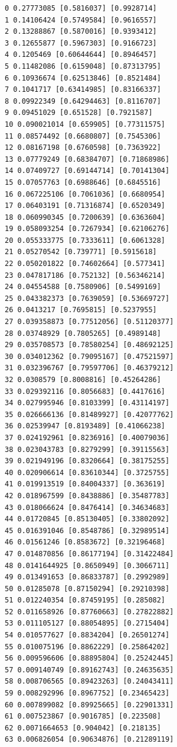 \documentclass[11pt]{article}
\begin{document}
    \begin{Verbatim}[commandchars=\\\{\}]
0 0.27773085 [0.5816037] [0.9928714]
1 0.14106424 [0.5749584] [0.9616557]
2 0.13288867 [0.5870016] [0.9393412]
3 0.12655877 [0.5967303] [0.9166723]
4 0.1205469 [0.60644644] [0.8946457]
5 0.11482086 [0.6159048] [0.87313795]
6 0.10936674 [0.62513846] [0.8521484]
7 0.1041717 [0.63414985] [0.83166337]
8 0.09922349 [0.64294463] [0.8116707]
9 0.09451029 [0.651528] [0.7921587]
10 0.090021014 [0.659905] [0.77311575]
11 0.08574492 [0.6680807] [0.7545306]
12 0.08167198 [0.6760598] [0.7363922]
13 0.07779249 [0.68384707] [0.71868986]
14 0.07409727 [0.69144714] [0.70141304]
15 0.07057763 [0.6988646] [0.6845516]
16 0.067225106 [0.7061036] [0.6680954]
17 0.06403191 [0.71316874] [0.6520349]
18 0.060990345 [0.7200639] [0.6363604]
19 0.058093254 [0.7267934] [0.62106276]
20 0.055333775 [0.7333611] [0.6061328]
21 0.05270542 [0.739771] [0.5915618]
22 0.050201822 [0.74602664] [0.577341]
23 0.047817186 [0.752132] [0.56346214]
24 0.04554588 [0.7580906] [0.5499169]
25 0.043382373 [0.7639059] [0.53669727]
26 0.0413217 [0.7695815] [0.5237955]
27 0.039358873 [0.77512056] [0.51120377]
28 0.03748929 [0.7805265] [0.4989148]
29 0.035708573 [0.78580254] [0.48692125]
30 0.034012362 [0.79095167] [0.47521597]
31 0.032396767 [0.79597706] [0.46379212]
32 0.0308579 [0.8008816] [0.45264286]
33 0.029392116 [0.8056683] [0.4417616]
34 0.027995946 [0.8103399] [0.43114197]
35 0.026666136 [0.81489927] [0.42077762]
36 0.02539947 [0.8193489] [0.41066238]
37 0.024192961 [0.8236916] [0.40079036]
38 0.023043783 [0.8279299] [0.39115563]
39 0.021949196 [0.8320664] [0.38175255]
40 0.020906614 [0.83610344] [0.3725755]
41 0.019913519 [0.84004337] [0.363619]
42 0.018967599 [0.8438886] [0.35487783]
43 0.018066624 [0.8476414] [0.34634683]
44 0.01720845 [0.85130405] [0.33802092]
45 0.016391046 [0.8548786] [0.32989514]
46 0.01561246 [0.8583672] [0.32196468]
47 0.014870856 [0.86177194] [0.31422484]
48 0.0141644925 [0.8650949] [0.3066711]
49 0.013491653 [0.86833787] [0.2992989]
50 0.01285078 [0.87150294] [0.29210398]
51 0.012240354 [0.87459195] [0.285082]
52 0.011658926 [0.87760663] [0.27822882]
53 0.011105127 [0.88054895] [0.2715404]
54 0.010577627 [0.8834204] [0.26501274]
55 0.010075196 [0.8862229] [0.25864202]
56 0.009596606 [0.88895804] [0.25242445]
57 0.009140749 [0.89162743] [0.24635635]
58 0.008706565 [0.89423263] [0.24043411]
59 0.008292996 [0.8967752] [0.23465423]
60 0.007899082 [0.89925665] [0.22901331]
61 0.007523867 [0.9016785] [0.223508]
62 0.0071664653 [0.904042] [0.218135]
63 0.006826054 [0.90634876] [0.21289119]

\end{Verbatim}
\end{document}
